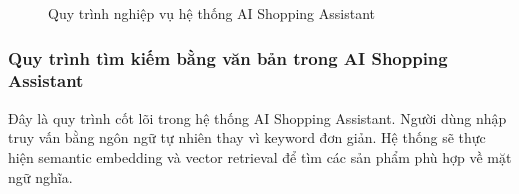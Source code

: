 \begin{figure}[H]

\caption{Quy trình nghiệp vụ hệ thống AI Shopping Assistant}
\label{fig:business-process}
\end{figure}


\subsubsection{Quy trình tìm kiếm bằng văn bản trong AI Shopping Assistant}

Đây là quy trình cốt lõi trong hệ thống AI Shopping Assistant. Người dùng nhập truy vấn bằng ngôn ngữ tự nhiên thay vì keyword đơn giản. Hệ thống sẽ thực hiện semantic embedding và vector retrieval để tìm các sản phẩm phù hợp về mặt ngữ nghĩa.





